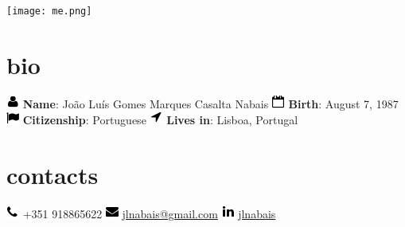 \documentclass[]{friggeri-cv} %
\begin{document}


\begin{aside} %
\texttt{[image: me.png]} 
\section{bio}
\includegraphics[scale=0.5, left]{USER.png}
\vspace{-5mm} \textbf{Name}: João Luís Gomes Marques Casalta Nabais
\includegraphics[scale=0.5, left]{calendar.png}
\vspace{-5mm} \textbf{Birth}: August 7, 1987
\includegraphics[scale=0.5, left]{flag.png}
\vspace{-5mm} \textbf{Citizenship}: Portuguese
\includegraphics[scale=0.5, left]{location.png} 
\vspace{-5mm} \textbf{Lives in}: Lisboa, Portugal
\section{contacts}
\includegraphics[scale=0.5, left]{phone.png} 
\vspace{-5mm} +351 918865622
\includegraphics[scale=0.5, left]{envelope.png}
\vspace{-5mm} \href{mailto:jlnabais@gmail.com}{jlnabais@gmail.com}
\includegraphics[scale=0.5, left]{linkedin.png} 
\vspace{-5mm} \href{http://www.linkedin.com/in/jlnabais}{jlnabais}

\end{aside}
\end{document}
